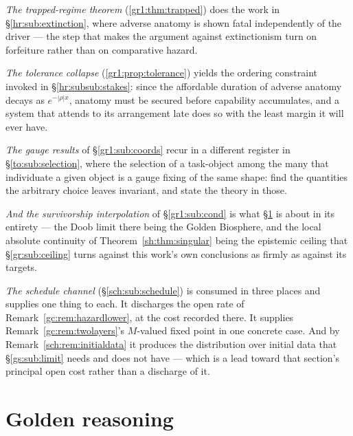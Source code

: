 \documentclass[11pt]{article}
\numberwithin{equation}{section}
\theoremstyle{plain}
\theoremstyle{definition}
\theoremstyle{remark}
\begin{document}
\emph{The trapped-regime theorem} (\ref{gr1:thm:trapped}) does the work
in \S\ref{hr:sub:extinction}, where adverse anatomy is shown fatal
independently of the driver --- the step that makes the argument against
extinctionism turn on forfeiture rather than on comparative hazard.

\emph{The tolerance collapse} (\ref{gr1:prop:tolerance}) yields the
ordering constraint invoked in \S\ref{hr:subsub:stakes}: since the
affordable duration of adverse anatomy decays as $e^{-|\rho|x}$, anatomy
must be secured before capability accumulates, and a system that
attends to its arrangement late does so with the least margin it will
ever have.

\emph{The gauge results} of \S\ref{gr1:sub:coords} recur in a different
register in \S\ref{to:sub:selection}, where the selection of a
task-object among the many that individuate a given object is a gauge
fixing of the same shape: find the quantities the arbitrary choice
leaves invariant, and state the theory in those.

\emph{And the survivorship interpolation} of \S\ref{gr1:sub:cond} is
what \S\ref{gr:sec} is about in its entirety --- the Doob limit there
being the Golden Biosphere, and the local absolute continuity of
Theorem~\ref{sh:thm:singular} being the epistemic ceiling that
\S\ref{gr:sub:ceiling} turns against this work's own conclusions as
firmly as against its targets.

\emph{The schedule channel} (\S\ref{sch:sub:schedule}) is consumed in
three places and supplies one thing to each. It discharges the open rate
of Remark~\ref{gc:rem:hazardlower}, at the cost recorded there. It
supplies Remark~\ref{gc:rem:twolayers}'s $M$-valued fixed point in one
concrete case. And by Remark~\ref{sch:rem:initialdata} it produces the
distribution over initial data that \S\ref{gs:sub:limit} needs and does
not have --- which is a lead toward that section's principal open cost
rather than a discharge of it.

\section{Golden reasoning}\label{gr:sec}
\setcounter{premise}{0} %
\end{document}
